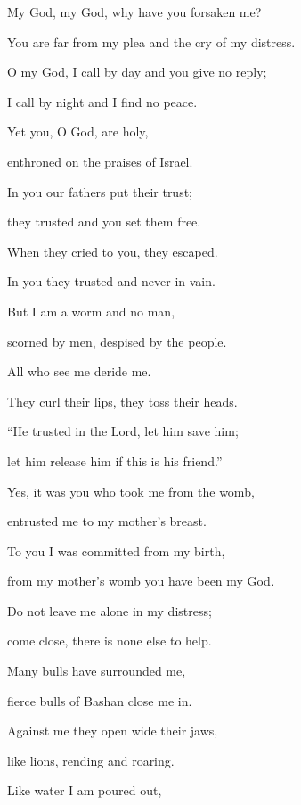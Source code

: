 \noindent My God, my God, why have you forsaken me?~\GreStar{}~\nopagebreak

You are far from my plea and the cry of my distress.

\noindent O my God, I call by day and you give no reply;~\GreStar{}~\nopagebreak

I call by night and I find no peace.

\noindent Yet you, O God, are holy,~\GreStar{}~\nopagebreak

enthroned on the praises of Israel.

\noindent In you our fathers put their trust;~\GreStar{}~\nopagebreak

they trusted and you set them free.

\noindent When they cried to you, they escaped.~\GreStar{}~\nopagebreak

In you they trusted and never in vain.

\noindent But I am a worm and no man,~\GreStar{}~\nopagebreak

scorned by men, despised by the people.

\noindent All who see me deride me.~\GreStar{}~\nopagebreak

They curl their lips, they toss their heads.

\noindent “He trusted in the Lord, let him save him;~\GreStar{}~\nopagebreak

let him release him if this is his friend.”

\noindent Yes, it was you who took me from the womb,~\GreStar{}~\nopagebreak

entrusted me to my mother’s breast.

\noindent To you I was committed from my birth,~\GreStar{}~\nopagebreak

from my mother’s womb you have been my God.

\noindent Do not leave me alone in my distress;~\GreStar{}~\nopagebreak

come close, there is none else to help.

\noindent Many bulls have surrounded me,~\GreStar{}~\nopagebreak

fierce bulls of Bashan close me in.

\noindent Against me they open wide their jaws,~\GreStar{}~\nopagebreak

like lions, rending and roaring.

\noindent Like water I am poured out,~\GreStar{}~\nopagebreak

